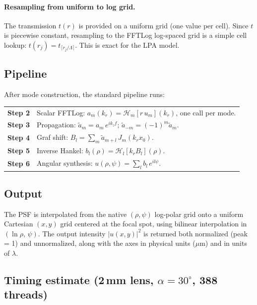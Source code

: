 \documentclass[11pt,a4paper]{article}
\newcommand{\HT}{\mathcal{H}}
\begin{document}
\paragraph{Resampling from uniform to log grid.}
The transmission $t(r)$ is provided on a uniform grid (one value per cell).
Since $t$ is piecewise constant, resampling to the FFTLog log-spaced grid is
a simple cell lookup: $t(r_j) = t_{\lceil r_j/\Lambda\rceil}$.  This is exact
for the LPA model.

\subsection{Pipeline}

After mode construction, the standard pipeline runs:
\begin{center}
\begin{tabular}{@{}r p{10cm}@{}}
\textbf{Step 2} & Scalar FFTLog: $a_m(k_r) = \HT_m[r\,u_m](k_r)$, one call per mode. \\
\textbf{Step 3} & Propagation: $\tilde a_m = a_m\,e^{ik_z f}$;\;
                   $\tilde a_{-m} = (-1)^m\tilde a_m$. \\
\textbf{Step 4} & Graf shift: $B_l = \sum_m \tilde a_{m+l}\,J_m(k_r x_0)$. \\
\textbf{Step 5} & Inverse Hankel: $b_l(\rho) = \HT_l[k_r B_l](\rho)$. \\
\textbf{Step 6} & Angular synthesis: $u(\rho,\psi) = \sum_l b_l\,e^{il\psi}$.
\end{tabular}
\end{center}

\subsection{Output}

The PSF is interpolated from the native $(\rho,\psi)$ log-polar grid onto
a uniform Cartesian $(x,y)$ grid centered at the focal spot, using bilinear
interpolation in $(\ln\rho,\,\psi)$.  The output intensity $|u(x,y)|^2$ is
returned both normalized (peak = 1) and unnormalized, along with the axes
in physical units ($\mu$m) and in units of $\lambda$.

\subsection{Timing estimate (2\,mm lens, $\alpha=30^\circ$, 388 threads)}
\end{document}
